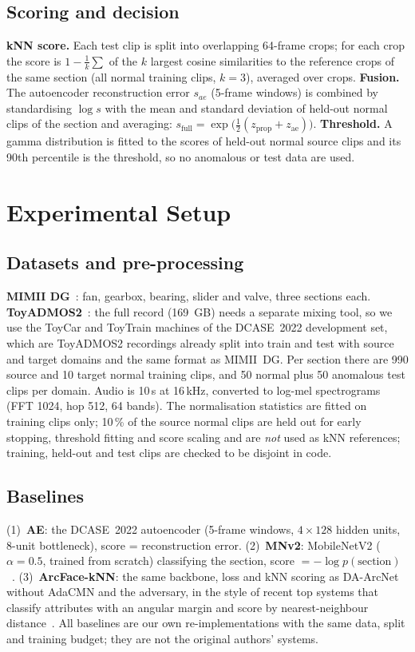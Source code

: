 \documentclass[conference]{IEEEtran}
\begin{document}
\subsection{Scoring and decision}
\textbf{kNN score.} Each test clip is split into overlapping 64-frame crops; for each crop the score is $1-\frac1k\sum$ of the $k$ largest cosine similarities to the reference crops of the same section (all normal training clips, $k=3$), averaged over crops. \textbf{Fusion.} The autoencoder reconstruction error $s_{ae}$ (5-frame windows) is combined by standardising $\log s$ with the mean and standard deviation of held-out normal clips of the section and averaging:
$s_{\mathrm{full}}=\exp\big(\tfrac12(z_{\mathrm{prop}}+z_{\mathrm{ae}})\big)$.
\textbf{Threshold.} A gamma distribution is fitted to the scores of held-out normal source clips and its 90th percentile is the threshold, so no anomalous or test data are used.

\section{Experimental Setup}
\subsection{Datasets and pre-processing}
\textbf{MIMII DG}~\cite{dohi2022mimiidg}: fan, gearbox, bearing, slider and valve, three sections each. \textbf{ToyADMOS2}~\cite{harada2021toyadmos2}: the full record (169~GB) needs a separate mixing tool, so we use the ToyCar and ToyTrain machines of the DCASE~2022 development set, which are ToyADMOS2 recordings already split into train and test with source and target domains and the same format as MIMII~DG. Per section there are 990 source and 10 target normal training clips, and 50 normal plus 50 anomalous test clips per domain. Audio is 10\,s at 16\,kHz, converted to log-mel spectrograms (FFT 1024, hop 512, 64 bands). The normalisation statistics are fitted on training clips only; 10\,\% of the source normal clips are held out for early stopping, threshold fitting and score scaling and are \emph{not} used as kNN references; training, held-out and test clips are checked to be disjoint in code.

\subsection{Baselines}
(1)~\textbf{AE}: the DCASE~2022 autoencoder (5-frame windows, $4\times128$ hidden units, 8-unit bottleneck), score = reconstruction error. (2)~\textbf{MNv2}: MobileNetV2 ($\alpha=0.5$, trained from scratch) classifying the section, score $=-\log p(\text{section})$~\cite{dohi2022dcase,sandler2018mobilenetv2}. (3)~\textbf{ArcFace-kNN}: the same backbone, loss and kNN scoring as DA-ArcNet without AdaCMN and the adversary, in the style of recent top systems that classify attributes with an angular margin and score by nearest-neighbour distance~\cite{wilkinghoff2024adaproj,saengthong2024genrep}. All baselines are our own re-implementations with the same data, split and training budget; they are not the original authors' systems.
\end{document}
